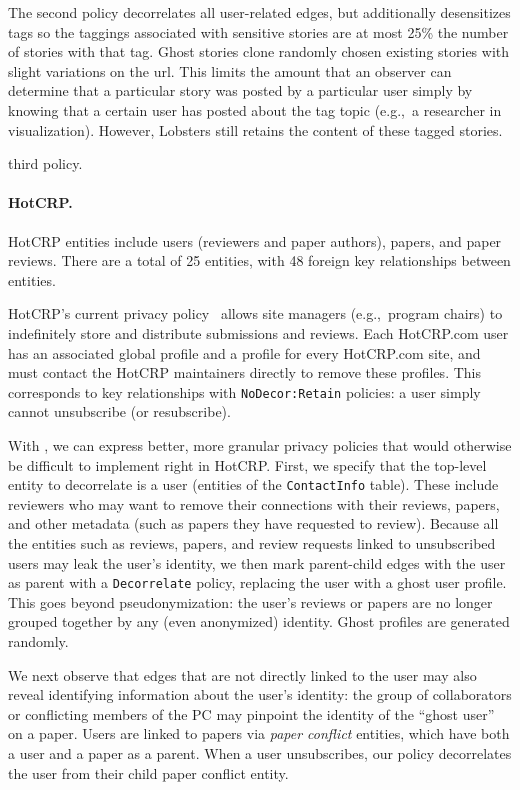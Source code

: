 The second policy decorrelates all user-related edges, but additionally desensitizes tags so the
taggings associated with sensitive stories are at most 25\% the number of stories with that tag.
Ghost stories clone randomly chosen existing stories with slight variations on the url.
This limits the amount that an observer can determine that a particular story was posted by a
particular user simply by knowing that a certain user has posted about the tag topic (e.g.,\ a researcher
in visualization). However, Lobsters still retains the content of these tagged stories.

 third policy.

\paragraph{HotCRP.}
HotCRP entities include users (reviewers and paper authors), papers, and paper reviews. There are a total of 25
entities, with 48 foreign key relationships between entities.

HotCRP's current privacy policy~\cite{hotcrp:privacy} allows site managers (e.g.,\ program chairs)
to indefinitely store and distribute submissions and reviews. Each HotCRP.com user has an associated
global profile and a profile for every HotCRP.com site, and must contact the HotCRP maintainers
directly to remove these profiles. This corresponds to key relationships with
\texttt{NoDecor:Retain} policies: a user simply cannot unsubscribe (or resubscribe).

With \sys, we can express better, more granular privacy policies that would otherwise be difficult to
implement right in HotCRP. First, we specify that the top-level entity to decorrelate is a user
(entities of the \texttt{ContactInfo} table). These include reviewers who may want
to remove their connections with their reviews, papers, and other metadata (such as papers they
have requested to review).
Because all the entities such as reviews, papers, and review requests linked to unsubscribed users
may leak the user's identity, we then mark parent-child edges with the user as parent with a
\texttt{Decorrelate} policy, replacing the user with a ghost user profile. This goes beyond
pseudonymization: the user's reviews or papers are no longer grouped together by any (even anonymized)
identity. Ghost profiles are generated randomly.

We next observe that edges that are not directly linked to the user may also reveal identifying
information about the user's identity: the group of collaborators or conflicting members of the PC
may pinpoint the identity of the ``ghost user'' on a paper. Users are linked to papers via
\emph{paper conflict} entities, which have both a user and a paper as a parent. When a user
unsubscribes, our policy decorrelates the user from their child paper conflict entity.

